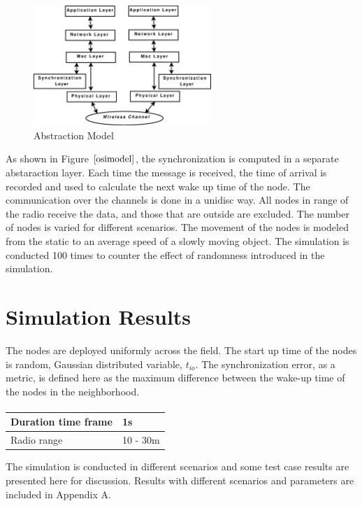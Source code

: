 \documentclass[a4paper,10pt]{report}
\begin{document}
\paragraph*{}
\begin{figure}
\centering
\includegraphics[width=0.6\textwidth]{osimodel}
\caption{Abstraction Model} \label{osimodel}
\end{figure}
As shown in Figure $\ref{osimodel}$, the synchronization is computed in a separate abstaraction layer. Each time the message is received, the time of arrival is recorded and used to calculate the next wake up time of the node. The communication over the channels is done in a unidisc way. All nodes in range of the radio receive the data, and those that are outside are excluded. The number of nodes is varied for different scenarios. The movement of the nodes is modeled from the static to an average speed of a slowly moving object. The simulation is conducted 100 times to counter the effect of randomness introduced in the simulation.
\section{\textbf{Simulation Results}}
The nodes are deployed uniformly across the field. %
The start up time of the nodes is random, Gaussian distributed variable, $t_{io}$. The synchronization error, as a metric, is defined here as  the maximum difference between the wake-up time of the nodes in the neighborhood.
\paragraph*{}
\begin{center}
    \begin{tabular}{ | l | l |}
    \hline
    Duration time frame & 1s \\ \hline
    Radio range & 10 - 30m \\ \hline
    \end{tabular}
\end{center}
The simulation is conducted in different scenarios and some test case results are presented here for discussion. Results with different scenarios and parameters are included in Appendix A.
\end{document}
